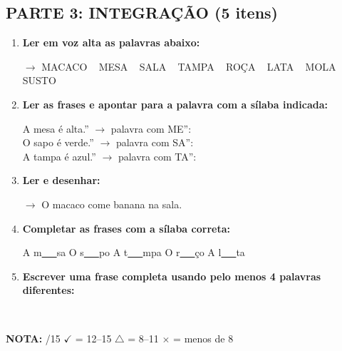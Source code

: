 \begin{exercicio}
\subsection*{PARTE 3: INTEGRAÇÃO (5 itens)}

\begin{enumerate}[resume]
  \item \textbf{Ler em voz alta as palavras abaixo:}
  \begin{center}
  $\rightarrow$ MACACO  ~  MESA  ~  SALA  ~  TAMPA  ~  ROÇA  ~  LATA  ~  MOLA  ~  SUSTO
  \end{center}

  \item \textbf{Ler as frases e apontar para a palavra com a sílaba indicada:}
  \begin{center}
  A mesa é alta.'' $\rightarrow$ palavra com ME'': \underline{\hspace{3cm}} \\
  O sapo é verde.'' $\rightarrow$ palavra com SA'': \underline{\hspace{3cm}} \\
  A tampa é azul.'' $\rightarrow$ palavra com TA'': \underline{\hspace{3cm}}
  \end{center}

  \item \textbf{Ler e desenhar:}
  \begin{center}
  $\rightarrow$ O macaco come banana na sala.
  \end{center}
  \begin{center}
  \end{center}

  \item \textbf{Completar as frases com a sílaba correta:}
  \begin{center}
  A m\underline{~~~}sa \quad O s\underline{~~~}po \quad A t\underline{~~~}mpa \quad O r\underline{~~~}ço \quad A l\underline{~~~}ta
  \end{center}

  \item \textbf{Escrever uma frase completa usando pelo menos 4 palavras diferentes:}
  \begin{center}
  \underline{\hspace{12cm}} \\
  \underline{\hspace{12cm}}
  \end{center}
\end{enumerate}

\noindent\textbf{NOTA:} \underline{\hspace{1cm}}/15 \quad $\checkmark$ = 12--15 \quad $\triangle$ = 8--11 \quad $\times$ = menos de 8
\end{exercicio}

